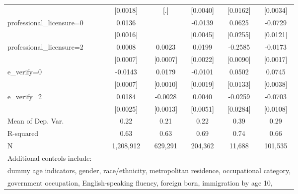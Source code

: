 \begin{table}[htbp]
\begin{tabular}{l*{5}{c}}
                    &    [0.0018]         &         [.]         &    [0.0040]         &    [0.0162]         &    [0.0034]         \\
\addlinespace
professional\_licensure=0&      0.0136\sym{***}&                     &     -0.0139\sym{***}&      0.0625\sym{**} &     -0.0729\sym{***}\\
                    &    [0.0016]         &                     &    [0.0045]         &    [0.0255]         &    [0.0121]         \\
\addlinespace
professional\_licensure=2&      0.0008         &      0.0023\sym{***}&      0.0199\sym{***}&     -0.2585\sym{***}&     -0.0173\sym{***}\\
                    &    [0.0007]         &    [0.0007]         &    [0.0022]         &    [0.0090]         &    [0.0017]         \\
\addlinespace
e\_verify=0          &     -0.0143\sym{***}&      0.0179\sym{***}&     -0.0101\sym{***}&      0.0502\sym{***}&      0.0745\sym{***}\\
                    &    [0.0007]         &    [0.0010]         &    [0.0019]         &    [0.0133]         &    [0.0038]         \\
\addlinespace
e\_verify=2          &      0.0184\sym{***}&     -0.0028\sym{*}  &      0.0040         &     -0.0259         &     -0.0703\sym{***}\\
                    &    [0.0025]         &    [0.0013]         &    [0.0051]         &    [0.0284]         &    [0.0108]         \\
\midrule
Mean of Dep. Var.   &        0.22         &        0.21         &        0.22         &        0.39         &        0.29         \\
R-squared           &        0.63         &        0.63         &        0.69         &        0.74         &        0.66         \\
N                   &   1,208,912         &     629,291         &     204,362         &      11,688         &     101,535         \\
\bottomrule
\multicolumn{6}{l}{\footnotesize Additional controls include:}\\
\multicolumn{6}{l}{\footnotesize dummy age indicators, gender, race/ethnicity, metropolitan residence, occupational category,}\\
\multicolumn{6}{l}{\footnotesize government occupation, English-speaking fluency, foreign born, immigration by age 10,}\\

\end{tabular}
\end{table}
